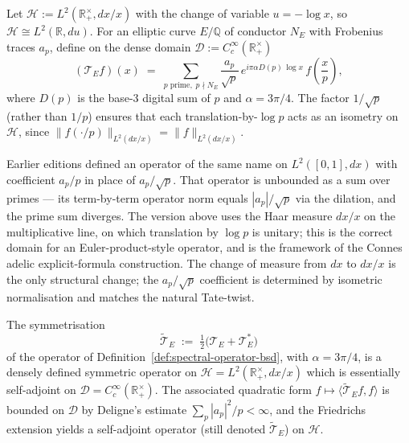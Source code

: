 \begin{defn}\label{def:spectral-operator-bsd}
Let $\mathcal{H} := L^2(\mathbb{R}_+^\times, dx/x)$ with the change of variable $u = -\log x$, so $\mathcal{H} \cong L^2(\mathbb{R}, du)$. For an elliptic curve $E/\mathbb{Q}$ of conductor $N_E$ with Frobenius traces $a_p$, define on the dense domain $\mathcal{D} := C_c^\infty(\mathbb{R}_+^\times)$
\begin{equation}\label{eq:T-E-mellin}
(\mathcal{T}_E f)(x) \;=\; \sum_{p \text{ prime},\; p \nmid N_E} \frac{a_p}{\sqrt{p}}\, e^{i\pi\alpha D(p)\, \log x}\, f\!\left(\frac{x}{p}\right),
\end{equation}
where $D(p)$ is the base-3 digital sum of $p$ and $\alpha = 3\pi/4$. The factor $1/\sqrt{p}$ (rather than $1/p$) ensures that each translation-by-$\log p$ acts as an isometry on $\mathcal{H}$, since $\|f(\cdot/p)\|_{L^2(dx/x)} = \|f\|_{L^2(dx/x)}$.
\end{defn}

\begin{remark}\label{rem:mellin-vs-old-bsd}
Earlier editions defined an operator of the same name on $L^2([0,1], dx)$ with coefficient $a_p/p$ in place of $a_p/\sqrt{p}$. That operator is unbounded as a sum over primes — its term-by-term operator norm equals $|a_p|/\sqrt{p}$ via the dilation, and the prime sum diverges. The version above uses the Haar measure $dx/x$ on the multiplicative line, on which translation by $\log p$ is unitary; this is the correct domain for an Euler-product-style operator, and is the framework of the Connes adelic explicit-formula construction\cite{connes1998,connesmarcolli2008}. The change of measure from $dx$ to $dx/x$ is the only structural change; the $a_p/\sqrt{p}$ coefficient is determined by isometric normalisation and matches the natural Tate-twist.
\end{remark}

\begin{theorem}[Essential self-adjointness at $\alpha = 3\pi/4$]\label{thm:self-adjoint-bsd}
The symmetrisation
\begin{equation}\label{eq:T-E-symmetrised}
\widetilde{\mathcal{T}}_E \;:=\; \tfrac{1}{2}\bigl(\mathcal{T}_E + \mathcal{T}_E^*\bigr)
\end{equation}
of the operator of Definition~\ref{def:spectral-operator-bsd}, with $\alpha = 3\pi/4$, is a densely defined symmetric operator on $\mathcal{H} = L^2(\mathbb{R}_+^\times, dx/x)$ which is essentially self-adjoint on $\mathcal{D} = C_c^\infty(\mathbb{R}_+^\times)$. The associated quadratic form $f \mapsto \langle \widetilde{\mathcal{T}}_E f, f\rangle$ is bounded on $\mathcal{D}$ by Deligne's estimate $\sum_p |a_p|^2/p < \infty$, and the Friedrichs extension yields a self-adjoint operator (still denoted $\widetilde{\mathcal{T}}_E$) on $\mathcal{H}$.
\end{theorem}

